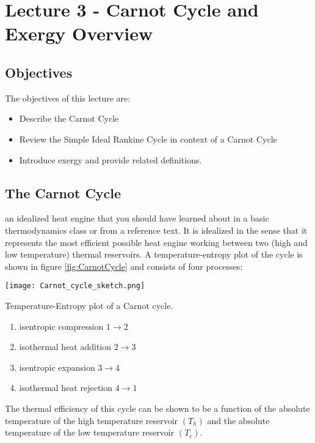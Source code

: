 \chapter{Lecture 3 - Carnot Cycle and Exergy Overview}
\label{ch:ch3}
\section{Objectives}
The objectives of this lecture are:
\begin{itemize}
\item Describe the Carnot Cycle
\item Review the Simple Ideal Rankine Cycle in context of a Carnot Cycle
\item Introduce exergy and provide related definitions.
\end{itemize}

\section{The Carnot Cycle}
 an idealized heat engine that you should have learned about in a basic thermodynamics class or from a reference text.\cite{moran2010fundamentals}  It is idealized in the sense that it represents the most efficient possible heat engine working between two (high and low temperature) thermal reservoirs.  A temperature-entropy plot of the cycle is shown in figure \ref{fig:CarnotCycle} and consists of four processes:

\begin{marginfigure}
\texttt{[image: Carnot\_cycle\_sketch.png]}
\caption{Temperature-Entropy plot of a Carnot cycle.}
\label{fig:CarnotCycle}
\end{marginfigure}

\begin{enumerate}
\item isentropic compression $1 \rightarrow 2$
\item isothermal heat addition $2 \rightarrow 3$
\item isentropic expansion $3 \rightarrow 4$
\item isothermal heat rejection $4 \rightarrow 1$

\end{enumerate}

The thermal efficiency of this cycle can be shown to be a function of the absolute temperature of the high temperature reservoir $\left(T_h\right)$ and the absolute temperature of the low temperature reservoir $\left(T_c\right)$.  

